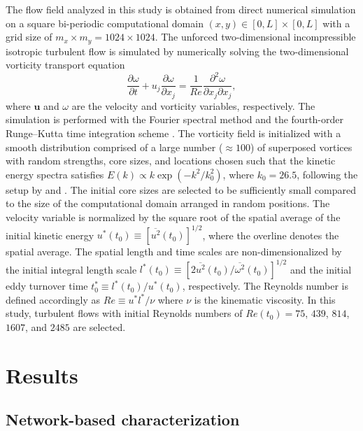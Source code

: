 \documentclass{jfm}
\begin{document}
The flow field analyzed in this study is obtained from direct numerical simulation on a square bi-periodic computational domain $(x,y) \in [0,L] \times [0,L]$ with a grid size of $m_x \times m_y = 1024 \times 1024$.  The unforced two-dimensional incompressible isotropic turbulent flow is simulated by numerically solving the two-dimensional vorticity transport equation 
\begin{equation}
   \frac{\partial \omega}{\partial t} + u_j \frac{\partial \omega}{\partial x_j} = \frac{1}{Re} \frac{\partial^2 \omega}{\partial x_j \partial x_j},
\end{equation}
where $\boldsymbol{u}$ and $\omega$ are the velocity and vorticity variables, respectively.  The simulation is performed with the Fourier spectral method and the fourth-order Runge--Kutta time integration scheme \citep{Canuto88}.  The vorticity field is initialized with a smooth distribution comprised of a large number ($\approx 100$) of superposed vortices \citep{Taylor:1918} with random strengths, core sizes, and locations chosen such that the kinetic energy spectra satisfies $E(k) \propto k \exp(-k^2/k_0^2)$, where $k_0 = 26.5$, following the setup by \cite{Brachet:PRL86} and \cite{Kida:JPSJ85}.  The initial core sizes are selected to be sufficiently small compared to the size of the computational domain \citep{McWilliams:JFM84} arranged in random positions.  The velocity variable is normalized by the square root of the spatial average of the initial kinetic energy $u^*(t_0) \equiv [\overline{u^2}(t_0)]^{1/2}$, where the overline denotes the spatial average.  The spatial length and time scales are non-dimensionalized by the initial integral length scale $l^*(t_0) \equiv [2\overline{u^2}(t_0)/\overline{\omega^2}(t_0)]^{1/2}$ and the initial eddy turnover time $t^*_0 \equiv l^*(t_0)/u^*(t_0)$, respectively.  The Reynolds number is defined accordingly as $Re \equiv u^* l^*/\nu$ where $\nu$ is the kinematic viscosity.  In this study, turbulent flows with initial Reynolds numbers of $Re(t_0) = 75$, $439$, $814$, $1607$, and $2485$ are selected.



\section{Results}

\subsection{Network-based characterization}
\end{document}
